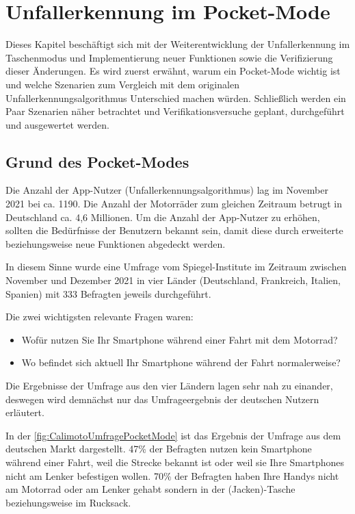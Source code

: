 \chapter{Unfallerkennung im Pocket-Mode}
Dieses Kapitel beschäftigt sich mit der Weiterentwicklung der Unfallerkennung im Taschenmodus und Implementierung neuer Funktionen sowie die Verifizierung dieser Änderungen. Es wird zuerst erwähnt, warum ein Pocket-Mode wichtig ist und welche Szenarien zum Vergleich mit dem originalen Unfallerkennungsalgorithmus Unterschied machen würden.
Schließlich werden ein Paar Szenarien näher betrachtet und Verifikationsversuche geplant, durchgeführt und ausgewertet werden.

\section{Grund des Pocket-Modes}
Die Anzahl der App-Nutzer (Unfallerkennungsalgorithmus) lag im November 2021 bei ca. 1190. Die Anzahl der Motorräder zum gleichen Zeitraum betrugt in Deutschland ca. 4,6 Millionen. Um die Anzahl der App-Nutzer zu erhöhen, sollten die Bedürfnisse der Benutzern bekannt sein, damit diese durch erweiterte beziehungsweise neue Funktionen abgedeckt werden.

In diesem Sinne wurde eine Umfrage vom Spiegel-Institute im Zeitraum zwischen November und Dezember 2021 in vier Länder (Deutschland, Frankreich, Italien, Spanien) mit 333 Befragten jeweils durchgeführt.

Die zwei wichtigsten relevante Fragen waren:
\begin{itemize}
	\item Wofür nutzen Sie Ihr Smartphone während einer Fahrt mit dem Motorrad?
	\item Wo befindet sich aktuell Ihr Smartphone während der Fahrt normalerweise?
\end{itemize}

Die Ergebnisse der Umfrage aus den vier Ländern lagen sehr nah zu einander, deswegen wird demnächst nur das Umfrageergebnis der deutschen Nutzern erläutert.

In der \autoref{fig:CalimotoUmfragePocketMode} ist das Ergebnis der Umfrage aus dem deutschen Markt dargestellt. 47\% der Befragten nutzen kein Smartphone während einer Fahrt, weil die Strecke bekannt ist oder weil sie Ihre Smartphones nicht am Lenker befestigen wollen. 70\% der Befragten haben Ihre Handys nicht am Motorrad oder am Lenker gehabt sondern in der (Jacken)-Tasche beziehungsweise im Rucksack. 

